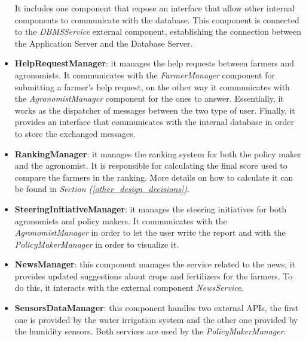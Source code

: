 \documentclass[table, 12pt]{article}
\begin{document}
\begin{itemize}
    It includes one component that expose an interface that allow other internal components to communicate with the database.
    This component is connected to the \textit{DBMSService} external component, establishing the connection between the Application Server and the Database Server.
    \item \textbf{HelpRequestManager}: it manages the help requests between farmers and agronomists.
    It communicates with the \textit{FarmerManager} component for submitting a farmer's help request, on the other way it communicates with the \textit{AgronomistManager} component for the ones to answer. Essentially, it works as the dispatcher of messages between the two type of user.
    Finally, it provides an interface that communicates with the internal database in order to store the exchanged messages.
    \item \textbf{RankingManager}: it manages the ranking system for both the policy maker and the agronomist.
    It is responsible for calculating the final score used to compare the farmers in the ranking.
    More details on how to calculate it can be found in \textit{Section (\ref{other_design_decisions})}.
    \item \textbf{SteeringInitiativeManager}: it manages the steering initiatives for both agronomists and policy makers. It communicates with the \textit{AgronomistManager} in order to let the user write the report and with the \textit{PolicyMakerManager} in order to visualize it.
    \item \textbf{NewsManager}: this component manages the service related to the news, it provides updated suggestions about crops and fertilizers for the farmers.
    To do this, it interacts with the external component \textit{NewsService}.
    \item \textbf{SensorsDataManager}: this component handles two external APIs, the first one is provided by the water irrigation system and the other one provided by the humidity sensors.
    Both services are used by the \textit{PolicyMakerManager}.
\end{itemize}
\end{document}

